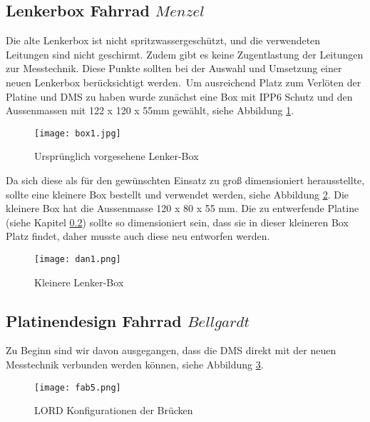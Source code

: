 \newpage{}
\subsection{Lenkerbox Fahrrad \(Menzel\)}
Die alte Lenkerbox ist nicht spritzwassergeschützt, und die verwendeten Leitungen sind nicht geschirmt.
Zudem gibt es keine Zugentlastung der Leitungen zur Messtechnik.
Diese Punkte sollten bei der Auswahl und Umsetzung einer neuen Lenkerbox berücksichtigt werden.\
Um ausreichend Platz zum Verlöten der Platine und DMS zu haben wurde zunächst eine Box mit IPP6 Schutz und den Aussenmassen mit  122 x 120 x 55mm gewählt, siehe Abbildung \ref{fig:box1}.

\begin{figure}[h]
    \begin{center}
        \texttt{[image: box1.jpg]}
        \caption[Urspr\"unglich vorgesehene Lenker-Box (Abbildungsverzeichnis)]{Urspr\"unglich vorgesehene Lenker-Box}
        
        \label{fig:box1}
    \end{center}
\end{figure}

Da sich diese als für den gewünschten Einsatz zu groß dimensioniert herausstellte, sollte eine kleinere Box bestellt und verwendet werden, siehe Abbildung \ref{fig:dan1}.
Die kleinere Box hat die Aussenmasse 120 x 80 x 55 mm. Die zu entwerfende Platine (siehe Kapitel \ref{sec:fahrradplatine}) sollte so dimensioniert sein, dass sie in dieser kleineren Box Platz findet, daher musste auch diese neu entworfen werden.

\begin{figure}[h]
    \begin{center}
        \texttt{[image: dan1.png]}
        \caption[Kleinere Lenker-Box (Abbildungsverzeichnis)]{Kleinere Lenker-Box}
        
        \label{fig:dan1}
    \end{center}
\end{figure}

\newpage{}
\subsection{Platinendesign Fahrrad \(Bellgardt\)}
\label{sec:fahrradplatine}
Zu Beginn sind wir davon ausgegangen, dass die DMS direkt mit der neuen Messtechnik verbunden werden können, siehe Abbildung \ref{fig:fab5}.
\begin{figure}[h]
    \begin{center}
        \texttt{[image: fab5.png]}
        \caption[LORD Konfigurationen der Brücken (Abbildungsverzeichnis)]{LORD Konfigurationen der Brücken}
        \cite{VLInkManual
        }
        
        \label{fig:fab5}
    \end{center}
\end{figure}


